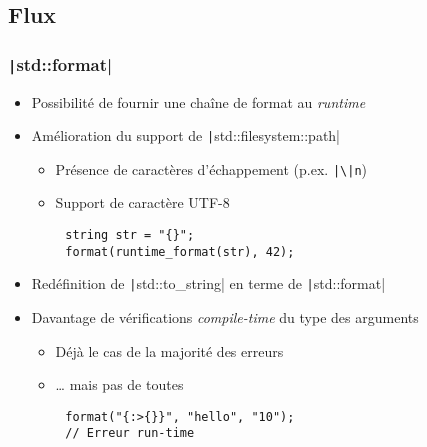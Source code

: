 \documentclass[C++.tex]{subfiles}
\begin{document}
\subsection*{Flux}
\begin{frame}[fragile]
	\frametitle{\texttt|std::format|}
	\begin{itemize}
		\item Possibilité de fournir une chaîne de format au \textit{runtime}
		\item Amélioration du support de \texttt|std::filesystem::path|
		\begin{itemize}
			\item Présence de caractères d'échappement (p.ex. \texttt{|\textbackslash|n})
			\item Support de caractère UTF-8
		\end{itemize}
	\end{itemize}

	\begin{verbatim}
		string str = "{}";
		format(runtime_format(str), 42);
	\end{verbatim}

	\begin{itemize}
		\item Redéfinition de \texttt|std::to_string| en terme de \texttt|std::format|
		\item Davantage de vérifications \textit{compile-time} du type des arguments
		\begin{itemize}
			\item Déjà le cas de la majorité des erreurs
			\item \ldots{} mais pas de toutes
		\end{itemize}
	\end{itemize}

	\begin{verbatim}
		format("{:>{}}", "hello", "10");
		// Erreur run-time
	\end{verbatim}



\end{frame}
\end{document}
